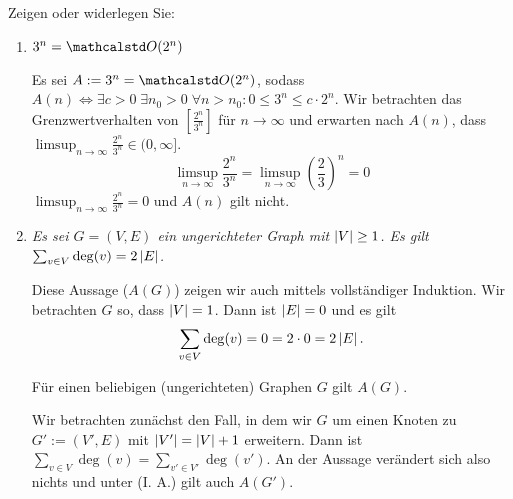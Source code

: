 \documentclass[10pt]{article}
\begin{document}
    \makecover

    \begin{aufgabe}[0]
        Zeigen oder widerlegen Sie:
    \end{aufgabe}

    \begin{loesung}
        \begin{enumerate}
            \item \textsl{$3^n = \O(2^n)$}

            \begin{gegenbeweis}
                Es sei $A := 3^n = \O(2^n)$, sodass $A(n) \iff \exists c > 0 \; \exists n_0 > 0 \; \forall n > n_0 : 0 \leq 3^n \leq c \cdot 2^n$.
                Wir betrachten das Grenzwertverhalten von $\left[\frac{2^n}{3^n}\right]$ für $n \to \infty$ und erwarten nach $A(n)$, dass $\limsup_{n \to \infty} \frac{2^n}{3^n} \in (0, \infty]$.
                \[
                    \limsup_{n \to \infty} \frac{2^n}{3^n} = \limsup_{n \to \infty} \left(\frac{2}{3}\right)^n = 0
                \]
                $\limsup_{n \to \infty} \frac{2^n}{3^n} = 0$ und $A(n)$ gilt nicht.
            \end{gegenbeweis}

            \item \textsl{Es sei $G = (V, E)$ ein ungerichteter Graph mit $\left|V\right| \geq 1$.
            Es gilt $\sum_{v \in V} \deg(v) = 2 \left|E\right|$.}

            \begin{beweis}
                Diese Aussage ($A(G)$) zeigen wir auch mittels vollständiger Induktion.
                \IB Wir betrachten $G$ so, dass $\left|V\right| = 1$.
                Dann ist $\left|E\right| = 0$ und es gilt
                \[
                    \sum_{v \in V} \deg(v) = 0 = 2 \cdot 0 = 2 \left|E\right|.
                \]

                \IA Für einen beliebigen (ungerichteten) Graphen $G$ gilt $A(G)$.

                \IS[1] Wir betrachten zunächst den Fall, in dem wir $G$ um einen Knoten zu $G' := (V', E)$ mit $\left|V'\right| = \left|V\right| + 1$ erweitern.
                Dann ist $\sum_{v \in V} \deg(v) = \sum_{v' \in V'} \deg(v')$.
                An der Aussage verändert sich also nichts und unter \textsf{(I. A.)} gilt auch $A(G')$.


\end{beweis}
\end{enumerate}
\end{loesung}
\end{document}
